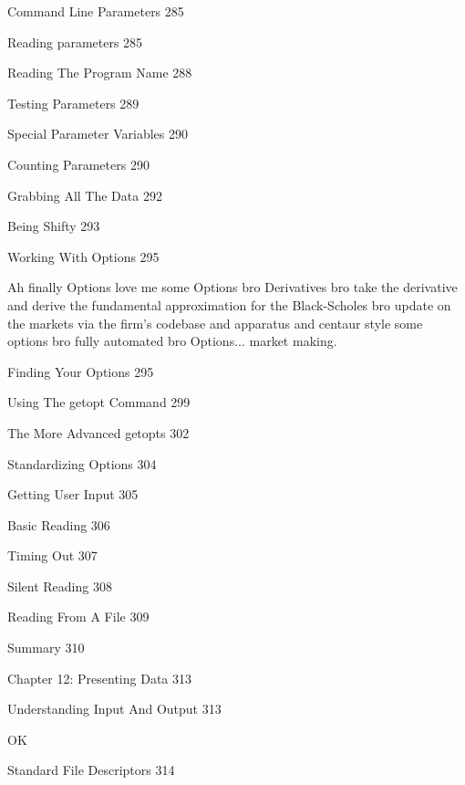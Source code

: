 Command Line Parameters 285



Reading parameters 285



Reading The Program Name 288



Testing Parameters 289



Special Parameter Variables 290



Counting Parameters 290



Grabbing All The Data 292



Being Shifty 293



Working With Options 295

Ah finally Options love me some Options bro Derivatives bro take the derivative and derive the fundamental approximation for the Black-Scholes bro update on the markets via the firm's codebase and apparatus and centaur style some options bro fully automated bro Options... market making.

Finding Your Options 295



Using The getopt Command 299



The More Advanced getopts 302



Standardizing Options 304



Getting User Input 305



Basic Reading 306



Timing Out 307



Silent Reading 308



Reading From A File 309



Summary 310



Chapter 12: Presenting Data 313



Understanding Input And Output 313

OK

Standard File Descriptors 314



